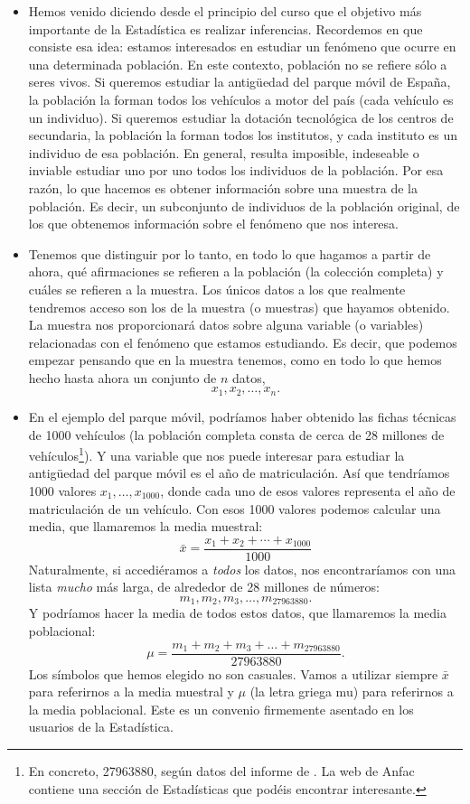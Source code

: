 \begin{itemize}

    \item Hemos venido diciendo desde el principio del curso que el objetivo más importante de la Estadística es realizar inferencias. Recordemos en que consiste esa idea: estamos interesados en estudiar un fenómeno que ocurre en una determinada {\sf población}. En este contexto, población no se refiere sólo a seres vivos. Si queremos estudiar la antigüedad del parque móvil de España, la población la forman todos los vehículos a motor del país (cada vehículo es un individuo). Si queremos estudiar la dotación tecnológica de los centros de secundaria, la población la forman todos los institutos, y cada instituto es un individuo de esa población. En general, resulta imposible, indeseable o inviable estudiar uno por uno todos los individuos de la población. Por esa razón, lo que hacemos es obtener información sobre una {\sf muestra} de la población. Es decir, un subconjunto de individuos de la población original, de los que obtenemos información sobre el fenómeno que nos interesa.

    \item Tenemos que distinguir por lo tanto, en todo lo que hagamos a partir de ahora, qué afirmaciones se refieren a la población (la colección completa) y cuáles se refieren a la muestra. Los únicos datos a los que realmente tendremos acceso son los de la muestra (o muestras) que hayamos obtenido. La muestra nos proporcionará datos sobre alguna variable (o variables) relacionadas con el fenómeno que estamos estudiando. Es decir, que podemos empezar pensando que en la muestra tenemos, como en todo lo que hemos hecho hasta ahora un conjunto de $n$ datos,
        \[x_1,x_2,\ldots,x_n.\]

    \item En el ejemplo del parque móvil, podríamos haber obtenido las fichas técnicas de 1000 vehículos (la población completa consta de cerca de 28 millones de vehículos\footnote{En concreto, 27963880, según datos del informe de . La web de Anfac contiene una sección de Estadísticas que podéis encontrar interesante.}). Y una variable que nos puede interesar para estudiar la antigüedad del parque móvil es el año de matriculación. Así que tendríamos 1000 valores $x_1,\ldots,x_{1000}$, donde cada uno de esos valores representa el año de matriculación de un vehículo. Con esos 1000 valores podemos calcular una media, que llamaremos la {\sf media muestral}:
        \[\bar x=\dfrac{x_1+x_2+\cdots+x_{1000}}{1000}\]
        Naturalmente, si accediéramos a {\em todos} los datos, nos encontraríamos con una lista {\em mucho} más larga, de alrededor de 28 millones de números:
        \[m_1,m_2,m_3,\ldots,m_{27963880}.\]
        Y podríamos hacer la media de todos estos datos, que llamaremos la {\sf media poblacional}:
        \[\mu=\dfrac{m_1+m_2+m_3+\ldots+m_{27963880}}{27963880}.\]
        Los símbolos que hemos elegido no son casuales. Vamos a utilizar siempre $\bar x$ para referirnos a la media muestral y $\mu$ (la letra griega mu) para referirnos a la media poblacional. Este es un convenio firmemente asentado en los usuarios de la Estadística.


\end{itemize}
